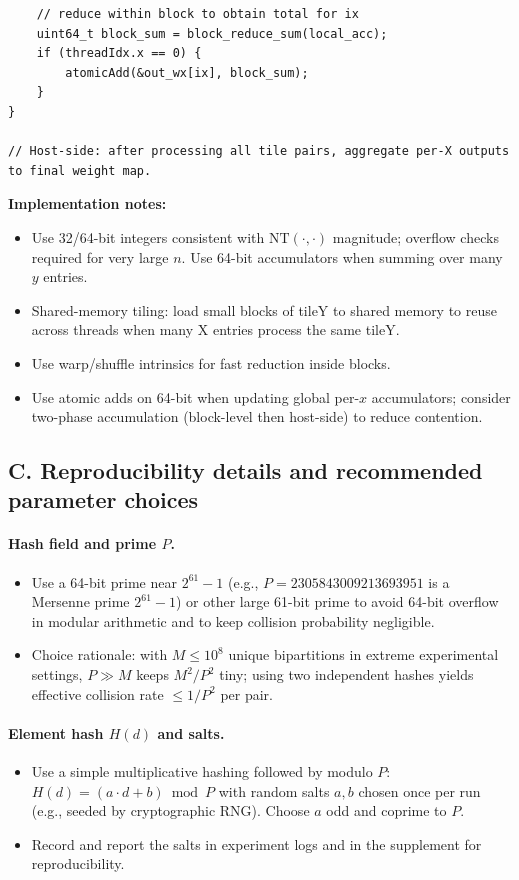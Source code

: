 \documentclass[10pt,a4paper]{article}
\begin{document}
\begin{enumerate}
\begin{verbatim}
    // reduce within block to obtain total for ix
    uint64_t block_sum = block_reduce_sum(local_acc);
    if (threadIdx.x == 0) {
        atomicAdd(&out_wx[ix], block_sum);
    }
}

// Host-side: after processing all tile pairs, aggregate per-X outputs to final weight map.
\end{verbatim}

\textbf{Implementation notes:}
\begin{itemize}
  \item Use 32/64-bit integers consistent with $\mathrm{NT}(\cdot,\cdot)$ magnitude; overflow checks required for very large $n$. Use 64-bit accumulators when summing over many $y$ entries.
  \item Shared-memory tiling: load small blocks of tileY to shared memory to reuse across threads when many X entries process the same tileY.
  \item Use warp/shuffle intrinsics for fast reduction inside blocks.
  \item Use atomic adds on 64-bit when updating global per-$x$ accumulators; consider two-phase accumulation (block-level then host-side) to reduce contention.
\end{itemize}

\vspace{4mm}
\subsection*{C. Reproducibility details and recommended parameter choices}

\paragraph{Hash field and prime $P$.}
\begin{itemize}
  \item Use a 64-bit prime near $2^{61}-1$ (e.g., $P=2305843009213693951$ is a Mersenne prime $2^{61}-1$) or other large 61-bit prime to avoid 64-bit overflow in modular arithmetic and to keep collision probability negligible.
  \item Choice rationale: with $M\le 10^8$ unique bipartitions in extreme experimental settings, $P\gg M$ keeps $M^2/P^2$ tiny; using two independent hashes yields effective collision rate $\le 1/P^2$ per pair.
\end{itemize}

\paragraph{Element hash $H(d)$ and salts.}
\begin{itemize}
  \item Use a simple multiplicative hashing followed by modulo $P$: $H(d) = (a\cdot d + b) \bmod P$ with random salts $a,b$ chosen once per run (e.g., seeded by cryptographic RNG). Choose $a$ odd and coprime to $P$.
  \item Record and report the salts in experiment logs and in the supplement for reproducibility.
\end{itemize}


\end{enumerate}
\end{document}
